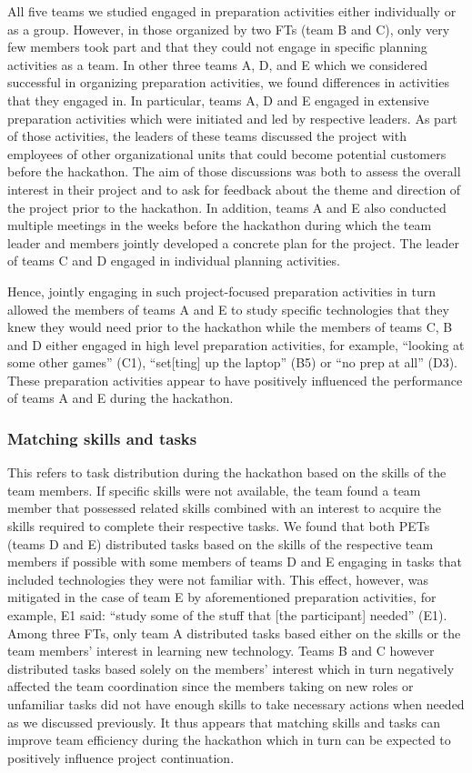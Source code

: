 \documentclass{hcij}
\begin{document}
All five teams we studied engaged in preparation activities either individually or as a group. However, in those organized by two FTs (team B and C), only very few members took part and that they could not engage in specific planning activities as a team. In other three teams A, D, and E which we considered successful in organizing preparation activities, we found differences in activities that they engaged in. In particular, teams A, D and E engaged in extensive preparation activities which were initiated and led by respective leaders. As part of those activities, the leaders of these teams discussed the project with employees of other organizational units that could become potential customers before the hackathon. The aim of those discussions was both to assess the overall interest in their project and to ask for feedback about the theme and direction of the project prior to the hackathon. In addition, teams A and E also conducted multiple meetings in the weeks before the hackathon during which the team leader and members jointly developed a concrete plan for the project. The leader of teams C and D engaged in individual planning activities.

Hence, jointly engaging in such project-focused preparation activities in turn allowed the members of teams A and E to study specific technologies that they knew they would need prior to the hackathon while the members of teams C, B and D either engaged in high level preparation activities, for example, “looking at some other games” (C1), “set[ting] up the laptop” (B5) or “no prep at all” (D3). These preparation activities appear to have positively influenced the performance of teams A and E during the hackathon.

\subsubsection{Matching skills and tasks}
This refers to task distribution during the hackathon based on the skills of the team members. If specific skills were not available, the team found a team member that possessed related skills combined with an interest to acquire the skills required to complete their respective tasks. We found that both PETs (teams D and E) distributed tasks based on the skills of the respective team members if possible with some members of teams D and E engaging in tasks that included technologies they were not familiar with. This effect, however, was mitigated in the case of team E by aforementioned preparation activities, for example, E1 said: “study some of the stuff that [the participant] needed” (E1). Among three FTs, only team A distributed tasks based either on the skills or the team members’ interest in learning new technology. Teams B and C however distributed tasks based solely on the members’ interest which in turn negatively affected the team coordination since the members taking on new roles or unfamiliar tasks did not have enough skills to take necessary actions when needed as we discussed previously. It thus appears that matching skills and tasks can improve team efficiency during the hackathon which in turn can be expected to positively influence project continuation.
\end{document}
